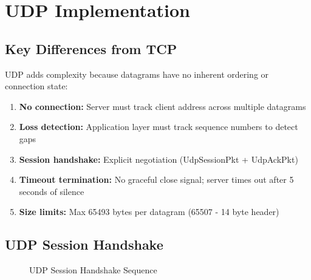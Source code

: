 \documentclass[12pt,a4paper]{article}
\begin{document}
\section{UDP Implementation}
\label{sec:udp}

\subsection{Key Differences from TCP}

UDP adds complexity because datagrams have no inherent ordering or connection state:

\begin{tcolorbox}[colback=udporange!5,colframe=udporange,title=UDP Challenges]
\begin{enumerate}
  \item \textbf{No connection:} Server must track client address across multiple datagrams
  \item \textbf{Loss detection:} Application layer must track sequence numbers to detect gaps
  \item \textbf{Session handshake:} Explicit negotiation (UdpSessionPkt + UdpAckPkt)
  \item \textbf{Timeout termination:} No graceful close signal; server times out after 5 seconds of silence
  \item \textbf{Size limits:} Max 65493 bytes per datagram (65507 - 14 byte header)
\end{enumerate}
\end{tcolorbox}

\subsection{UDP Session Handshake}

\begin{figure}[H]
\centering
{}
\caption{UDP Session Handshake Sequence}
\label{fig:udp_handshake}
\end{figure}
\end{document}
